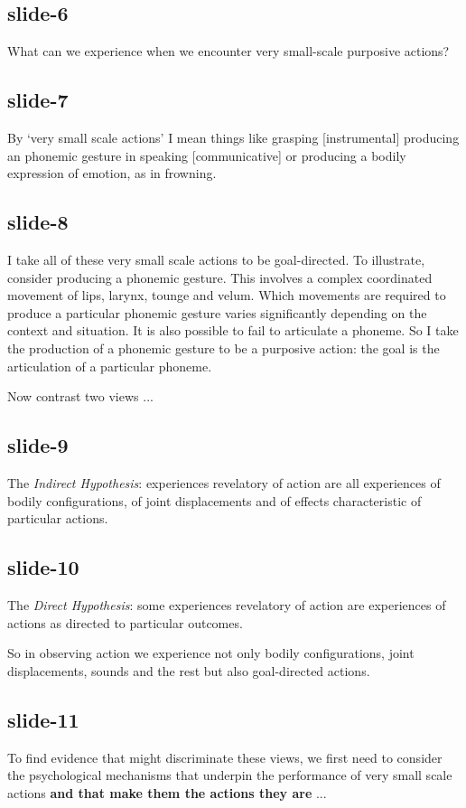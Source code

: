 \documentclass[12pt,\papersize]{extarticle}
\begin{document}
\subsection{slide-6}
What can we experience
when we encounter
very small-scale purposive actions?

\subsection{slide-7}
By ‘very small scale actions’ I mean things like
grasping [instrumental]
producing an phonemic gesture in speaking [communicative]
or producing a bodily expression of emotion, as in frowning.

\subsection{slide-8}
I take all of these very small scale actions to be goal-directed.
To illustrate, consider producing a phonemic gesture.
This involves a complex coordinated movement of lips, larynx, tounge and velum.
Which movements are required to produce a particular phonemic gesture varies
significantly depending on the context and situation. It is also possible to
fail to articulate a phoneme.
So I take the production of a phonemic gesture to be a purposive action:
the goal is the articulation of a particular phoneme.

Now contrast two views ...

\subsection{slide-9}
The \emph{Indirect Hypothesis}: experiences revelatory of action are all experiences of bodily
configurations, of joint displacements and of effects characteristic of particular actions.

\subsection{slide-10}
The \emph{Direct Hypothesis}: some experiences revelatory of action are experiences of actions as
directed to particular outcomes.

So in observing action we experience not only bodily configurations,
joint displacements, sounds and the rest but also goal-directed actions.

\subsection{slide-11}
To find evidence that might discriminate these views, we first need to
consider the psychological mechanisms that underpin the performance of
very small scale actions \textbf{and that make them the actions they are} ...
\end{document}
